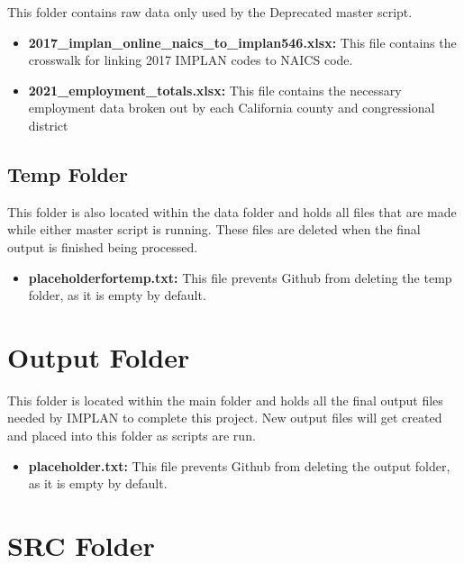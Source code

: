 \documentclass[
]{book}
\providecommand{\tightlist}{%
  \setlength{\itemsep}{0pt}\setlength{\parskip}{0pt}}
\begin{document}
This folder contains raw data only used by the Deprecated master script.

\begin{itemize}
\tightlist
\item
  \textbf{2017\_implan\_online\_naics\_to\_implan546.xlsx:} This file contains the crosswalk for linking 2017 IMPLAN codes to NAICS code.
\item
  \textbf{2021\_employment\_totals.xlsx:} This file contains the necessary employment data broken out by each California county and congressional district
\end{itemize}

\hypertarget{temp-folder}{%
\subsection{Temp Folder}\label{temp-folder}}

This folder is also located within the data folder and holds all files that are made while either master script is running. These files are deleted when the final output is finished being processed.

\begin{itemize}
\tightlist
\item
  \textbf{placeholderfortemp.txt:} This file prevents Github from deleting the temp folder, as it is empty by default.
\end{itemize}

\hypertarget{output-folder}{%
\section{Output Folder}\label{output-folder}}

This folder is located within the main folder and holds all the final output files needed by IMPLAN to complete this project. New output files will get created and placed into this folder as scripts are run.

\begin{itemize}
\tightlist
\item
  \textbf{placeholder.txt:} This file prevents Github from deleting the output folder, as it is empty by default.
\end{itemize}

\hypertarget{src-folder}{%
\section{SRC Folder}\label{src-folder}}
\end{document}
